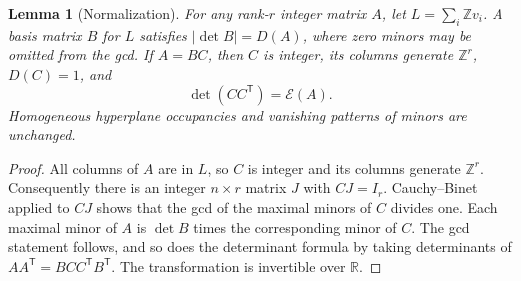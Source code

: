 \documentclass[11pt]{article}
\newtheorem{lemma}[theorem]{Lemma}
\theoremstyle{remark}\newtheorem{remark}[theorem]{Remark}
\newcommand{\Z}{\mathbb Z}\newcommand{\R}{\mathbb R}\newcommand{\F}{\mathbb F}
\begin{document}
\begin{lemma}[Normalization]\label{lem:norm}
For any rank-$r$ integer matrix $A$, let $L=\sum_i\Z v_i$. A basis matrix $B$ for $L$ satisfies $|\det B|=D(A)$, where zero minors may be omitted from the gcd. If $A=BC$, then $C$ is integer, its columns generate $\Z^r$, $D(C)=1$, and
\[
 \det(CC^{\mathsf T})=\mathcal E(A).
\]
Homogeneous hyperplane occupancies and vanishing patterns of minors are unchanged.
\end{lemma}
\begin{proof}
All columns of $A$ are in $L$, so $C$ is integer and its columns generate $\Z^r$. Consequently there is an integer $n\times r$ matrix $J$ with $CJ=I_r$. Cauchy--Binet applied to $CJ$ shows that the gcd of the maximal minors of $C$ divides one. Each maximal minor of $A$ is $\det B$ times the corresponding minor of $C$. The gcd statement follows, and so does the determinant formula by taking determinants of $AA^{\mathsf T}=BCC^{\mathsf T}B^{\mathsf T}$. The transformation is invertible over $\R$.
\end{proof}
\end{document}
